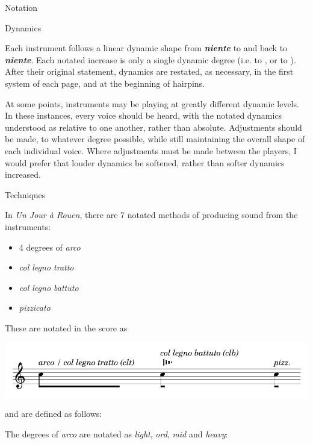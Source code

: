\documentclass{article}
\begin{document}
{\huge Notation}

{\large Dynamics}

Each instrument follows a linear dynamic shape from \textbf{\textit{niente}} to 
and back to \textit{\textbf{niente}}. Each notated increase is only a single dynamic
degree (i.e.  to , or  to ).
After their original statement, dynamics are restated, as necessary, in the first
system of each page, and at the beginning of hairpins.

At some points, instruments may be playing at greatly different dynamic levels.
In these instances, every voice should be heard, with the notated dynamics
understood as relative to one another, rather than absolute. Adjustments should be
made, to whatever degree possible, while still maintaining the overall shape of
each individual voice. Where adjustments must be made between the players, I would
prefer that louder dynamics be softened, rather than softer dynamics increased.

\pagebreak


{\large Techniques}

In \textit{Un Jour à Rouen}, there are 7 notated methods of producing sound from the instruments:
\begin{itemize}
  \item 4 degrees of \textit{arco}
  \item \textit{col legno tratto}
  \item \textit{col legno battuto}
  \item \textit{pizzicato}
\end{itemize}

These are notated in the score as

\begin{center}
  \includegraphics[scale=.8]{./attacks2.pdf}
\end{center}

and are defined as follows:

The degrees of \textit{arco} are notated as \textit{light}, \textit{ord}, \textit{mid} and \textit{heavy}:
\end{document}
